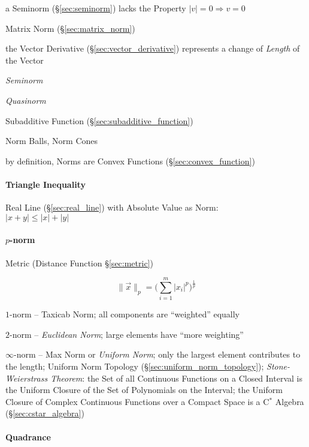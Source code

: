 a Seminorm (\S\ref{sec:seminorm}) lacks the Property $|v| = 0 \Longrightarrow v
= 0$

\fist Matrix Norm (\S\ref{sec:matrix_norm})

the Vector Derivative (\S\ref{sec:vector_derivative}) represents a change of
\emph{Length} of the Vector

\emph{Seminorm}

\emph{Quasinorm}

Subadditive Function (\S\ref{sec:subadditive_function})

Norm Balls, Norm Cones

by definition, Norms are Convex Functions (\S\ref{sec:convex_function})



\paragraph{Triangle Inequality}\label{sec:triangle_inequality}\hfill

Real Line (\S\ref{sec:real_line}) with Absolute Value as Norm:\\
$|x + y| \leq |x| + |y|$



\paragraph{$p$-norm}\label{sec:p_norm}\hfill

\fist Metric (Distance Function \S\ref{sec:metric})

\[
  \|\vec{x}\|_p = \Big(\sum_{i=1}^m|x_i|^p\Big)^{\frac{1}{p}}
\]

$1$-norm -- Taxicab Norm; all components are ``weighted'' equally

$2$-norm -- \emph{Euclidean Norm}; large elements have ``more weighting''

$\infty$-norm -- Max Norm or \emph{Uniform Norm}; only the largest element
contributes to the length; Uniform Norm Topology
(\S\ref{sec:uniform_norm_topology}); \emph{Stone-Weierstrass Theorem}: the Set
of all Continuous Functions on a Closed Interval is the Uniform Closure of the
Set of Polynomials on the Interval;
the Uniform Closure of Complex Continuous Functions over a Compact Space is a
C$^*$ Algebra (\S\ref{sec:cstar_algebra})



\paragraph{Quadrance}\label{sec:quadrance}\hfill

